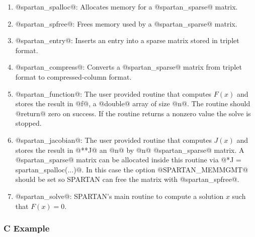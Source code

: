 \documentclass[10pt]{article}
\newcommand{\solverf}{\sffamily}
\newcommand{\spartan}{{\solverf SPARTAN}}
\begin{document}
\begin{enumerate}
\item @spartan_spalloc@: Allocates memory for a @spartan_sparse@ matrix. 
\item @spartan_spfree@: Frees memory used by a @spartan_sparse@ matrix.
\item @spartan_entry@: Inserts an entry into a sparse matrix stored in triplet format.
\item @spartan_compress@: Converts a @spartan_sparse@ matrix from triplet
format to compressed-column format.
\item @spartan_function@: The user provided routine that computes
  $F(x)$ and stores the result in @f@, a @double@ array of size
  @n@. The routine should @return@ zero on success. If the routine
  returns a nonzero value the solve is stopped.
\item @spartan_jacobian@: The user provided routine that computes
  $J(x)$ and stores the result in @**J@ an @n@ by @n@ @spartan_sparse@
  matrix.  A @spartan_sparse@ matrix can be allocated inside this
  routine via @*J = spartan_spalloc(...)@. In this case the option
  @SPARTAN_MEMMGMT@ should be set so \spartan{} can free the matrix
  with @spartan_spfree@.

\item @spartan_solve@: \spartan{}'s main routine to compute 
a solution $x$ such that  $F(x) = 0$.
\end{enumerate}

\subsubsection*{C Example}
\end{document}
